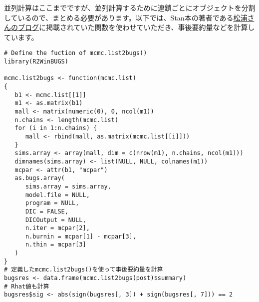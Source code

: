 並列計算はここまでですが、並列計算するために連鎖ごとにオブジェクトを分割しているので、まとめる必要があります。以下では、Stan本の著者である\href{https://statmodeling.hatenablog.com/entry/jags-mcmclist2bugs}{松浦さんのブログ}に掲載されていた関数を使わせていただき、事後要約量などを計算しています。
\begin{verbatim}
# Define the fuction of mcmc.list2bugs()
library(R2WinBUGS)

mcmc.list2bugs <- function(mcmc.list)
{
   b1 <- mcmc.list[[1]]
   m1 <- as.matrix(b1)
   mall <- matrix(numeric(0), 0, ncol(m1))
   n.chains <- length(mcmc.list)
   for (i in 1:n.chains) {
      mall <- rbind(mall, as.matrix(mcmc.list[[i]]))
   }
   sims.array <- array(mall, dim = c(nrow(m1), n.chains, ncol(m1)))
   dimnames(sims.array) <- list(NULL, NULL, colnames(m1))
   mcpar <- attr(b1, "mcpar")
   as.bugs.array(
      sims.array = sims.array,
      model.file = NULL,
      program = NULL,
      DIC = FALSE,
      DICOutput = NULL,
      n.iter = mcpar[2],
      n.burnin = mcpar[1] - mcpar[3],
      n.thin = mcpar[3]
   )
}
# 定義したmcmc.list2bugs()を使って事後要約量を計算
bugsres <- data.frame(mcmc.list2bugs(post)$summary)
# Rhat値も計算
bugsres$sig <- abs(sign(bugsres[, 3]) + sign(bugsres[, 7])) == 2
\end{verbatim}
